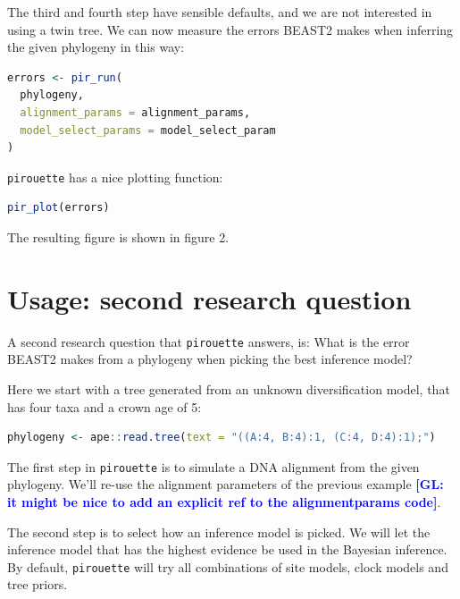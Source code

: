 \documentclass{article}
\newcommand{\giovanni}[1]{\textcolor{blue}{\textbf{[GL: #1]}}}
\begin{document}
The third and fourth step have sensible defaults, and we are not
interested in using a twin tree. We can now measure the errors BEAST2
makes when inferring the given phylogeny in this way:

\begin{lstlisting}[language=R, floatplacement=H]
errors <- pir_run(
  phylogeny,
  alignment_params = alignment_params,
  model_select_params = model_select_param
)
\end{lstlisting}

\verb;pirouette; has a nice plotting function:

\begin{lstlisting}[language=R, floatplacement=H]
pir_plot(errors)
\end{lstlisting}

The resulting figure is shown in figure 2.

\section{Usage: second research question}

A second research question that \verb;pirouette; answers, is:
What is the error BEAST2 makes from a phylogeny when
picking the best inference model?

Here we start with a tree generated from an unknown 
diversification model, that has four taxa and a crown age of 5:

\begin{lstlisting}[language=R, floatplacement=H]
phylogeny <- ape::read.tree(text = "((A:4, B:4):1, (C:4, D:4):1);")
\end{lstlisting}

The first step in \verb;pirouette; is to simulate a DNA alignment from the 
given phylogeny. We'll re-use the alignment parameters of the previous example \giovanni{it might be nice to add an explicit ref to the alignmentparams code}.

The second step is to select how an inference model is picked.
We will let the inference model that has the highest evidence be used
in the Bayesian inference. By default, \verb;pirouette; will try
all combinations of site models, clock models and tree priors.
\end{document}
